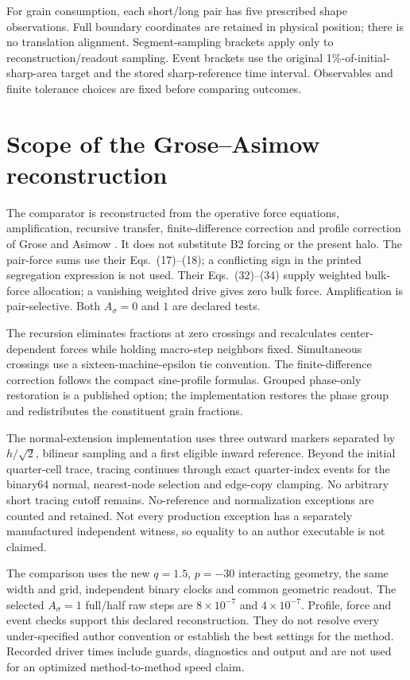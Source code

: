 \documentclass[a4paper,11pt]{article}
\begin{document}
For grain consumption, each short/long pair has five prescribed shape observations. Full boundary coordinates are retained in physical position; there is no translation alignment. Segment-sampling brackets apply only to reconstruction/readout sampling. Event brackets use the original 1\%-of-initial-sharp-area target and the stored sharp-reference time interval. Observables and finite tolerance choices are fixed before comparing outcomes.

\section{Scope of the Grose--Asimow reconstruction}
The comparator is reconstructed from the operative force equations, amplification, recursive transfer, finite-difference correction and profile correction of Grose and Asimow \citep{grose2022}. It does not substitute B2 forcing or the present halo. The pair-force sums use their Eqs.~(17)--(18); a conflicting sign in the printed segregation expression is not used. Their Eqs.~(32)--(34) supply weighted bulk-force allocation; a vanishing weighted drive gives zero bulk force. Amplification is pair-selective. Both $A_\sigma=0$ and $1$ are declared tests.

The recursion eliminates fractions at zero crossings and recalculates center-dependent forces while holding macro-step neighbors fixed. Simultaneous crossings use a sixteen-machine-epsilon tie convention. The finite-difference correction follows the compact sine-profile formulas. Grouped phase-only restoration is a published option; the implementation restores the phase group and redistributes the constituent grain fractions.

The normal-extension implementation uses three outward markers separated by $h/\sqrt2$, bilinear sampling and a first eligible inward reference. Beyond the initial quarter-cell trace, tracing continues through exact quarter-index events for the binary64 normal, nearest-node selection and edge-copy clamping. No arbitrary short tracing cutoff remains. No-reference and normalization exceptions are counted and retained. Not every production exception has a separately manufactured independent witness, so equality to an author executable is not claimed.

The comparison uses the new $q=1.5$, $p=-30$ interacting geometry, the same width and grid, independent binary clocks and common geometric readout. The selected $A_\sigma=1$ full/half raw steps are $8\times10^{-7}$ and $4\times10^{-7}$. Profile, force and event checks support this declared reconstruction. They do not resolve every under-specified author convention or establish the best settings for the method. Recorded driver times include guards, diagnostics and output and are not used for an optimized method-to-method speed claim.
\end{document}

